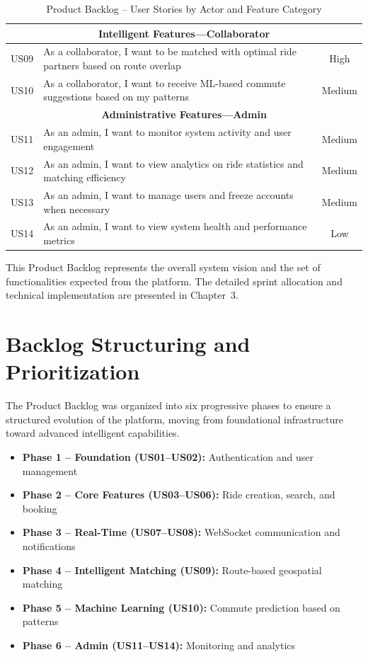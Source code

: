 \begin{table}[H]
\begin{tabular}{|c|p{8.8cm}|c|}
\multicolumn{3}{|c|}{\textbf{Intelligent Features---Collaborator}} \\
\hline
US09 & As a collaborator, I want to be matched with optimal ride partners based on route overlap & High \\
\hline
US10 & As a collaborator, I want to receive ML-based commute suggestions based on my patterns & Medium \\
\hline

\multicolumn{3}{|c|}{\textbf{Administrative Features---Admin}} \\
\hline
US11 & As an admin, I want to monitor system activity and user engagement & Medium \\
\hline
US12 & As an admin, I want to view analytics on ride statistics and matching efficiency & Medium \\
\hline
US13 & As an admin, I want to manage users and freeze accounts when necessary & Medium \\
\hline
US14 & As an admin, I want to view system health and performance metrics & Low \\
\hline

\end{tabular}

\caption{Product Backlog -- User Stories by Actor and Feature Category}
\label{tab:backlog}
\end{table}

This Product Backlog represents the overall system vision and the set of functionalities expected from the platform. The detailed sprint allocation and technical implementation are presented in Chapter~3.
\section{Backlog Structuring and Prioritization}

The Product Backlog was organized into six progressive phases to ensure a structured evolution of the platform, moving from foundational infrastructure toward advanced intelligent capabilities.

\begin{itemize}
    \item \textbf{Phase 1 -- Foundation (US01--US02):} Authentication and user management
    \item \textbf{Phase 2 -- Core Features (US03--US06):} Ride creation, search, and booking
    \item \textbf{Phase 3 -- Real-Time (US07--US08):} WebSocket communication and notifications
    \item \textbf{Phase 4 -- Intelligent Matching (US09):} Route-based geospatial matching
    \item \textbf{Phase 5 -- Machine Learning (US10):} Commute prediction based on patterns
    \item \textbf{Phase 6 -- Admin (US11--US14):} Monitoring and analytics
\end{itemize}


